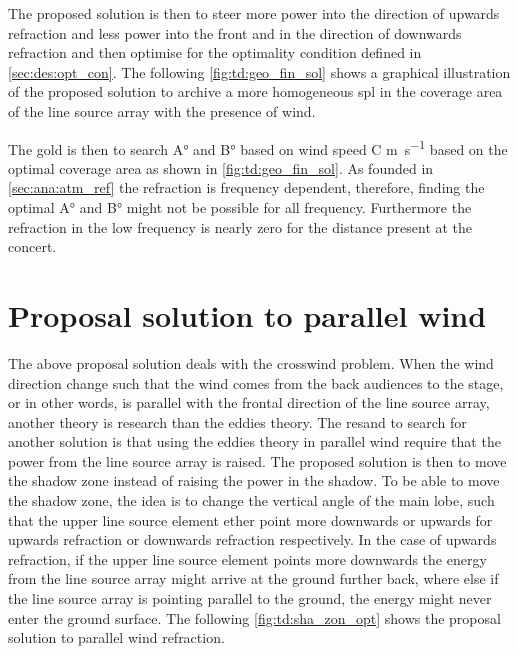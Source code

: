The proposed solution is then to steer more power into the direction of upwards refraction and less power into the front and in the direction of downwards refraction and then optimise for the optimality condition defined in \autoref{sec:des:opt_con}. The following \autoref{fig:td:geo_fin_sol} shows a graphical illustration of the proposed solution to archive a more homogeneous \gls{spl} in the coverage area of the line source array with the presence of wind.


The gold is then to search A\si{\degree} and B\si{\degree} based on wind speed C \si{\meter\per\second} based on the optimal coverage area as shown in \autoref{fig:td:geo_fin_sol}. As founded in \autoref{sec:ana:atm_ref} the refraction is frequency dependent, therefore, finding the optimal  A\si{\degree} and B\si{\degree} might not be possible for all frequency. Furthermore the refraction in the low frequency is nearly zero for the distance present at the concert.  


\section{Proposal solution to parallel wind}\label{sec:des:pro_para}
The above proposal solution deals with the crosswind problem. When the wind direction change such that the wind comes from the back audiences to the stage, or in other words, is parallel with the frontal direction of the line source array, another theory is research than the eddies theory. The resand to search for another solution is that using the eddies theory in parallel wind require that the power from the line source array is raised. The proposed solution is then to move the shadow zone instead of raising the power in the shadow. To be able to move the shadow zone, the idea is to change the vertical angle of the main lobe, such that the upper line source element ether point more downwards or upwards for upwards refraction or downwards refraction respectively. In the case of upwards refraction, if the upper line source element points more downwards the energy from the line source array might arrive at the ground further back, where else if the line source array is pointing parallel to the ground, the energy might never enter the ground surface. The following \autoref{fig:td:sha_zon_opt} shows the proposal solution to parallel wind refraction.  

